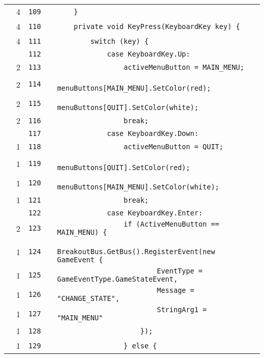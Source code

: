 \documentclass[a4paper,landscape,10pt]{article}
\begin{document}
\begin{longtable}[l]{lrrll}
\cellcolor{green} & 4 & \verb~109~ & & \verb~    }~\\
\cellcolor{green} & 4 & \verb~110~ & & \verb~    private void KeyPress(KeyboardKey key) {~\\
\cellcolor{green} & 4 & \verb~111~ & & \verb~        switch (key) {~\\
\cellcolor{gray} &  & \verb~112~ & & \verb~            case KeyboardKey.Up:~\\
\cellcolor{green} & 2 & \verb~113~ & & \verb~                activeMenuButton = MAIN_MENU;~\\
\cellcolor{green} & 2 & \verb~114~ & & \verb~                menuButtons[MAIN_MENU].SetColor(red);~\\
\cellcolor{green} & 2 & \verb~115~ & & \verb~                menuButtons[QUIT].SetColor(white);~\\
\cellcolor{green} & 2 & \verb~116~ & & \verb~                break;~\\
\cellcolor{gray} &  & \verb~117~ & & \verb~            case KeyboardKey.Down:~\\
\cellcolor{green} & 1 & \verb~118~ & & \verb~                activeMenuButton = QUIT;~\\
\cellcolor{green} & 1 & \verb~119~ & & \verb~                menuButtons[QUIT].SetColor(red);~\\
\cellcolor{green} & 1 & \verb~120~ & & \verb~                menuButtons[MAIN_MENU].SetColor(white);~\\
\cellcolor{green} & 1 & \verb~121~ & & \verb~                break;~\\
\cellcolor{gray} &  & \verb~122~ & & \verb~            case KeyboardKey.Enter:~\\
\cellcolor{orange} & 2 & \verb~123~ & & \verb~                if (ActiveMenuButton == MAIN_MENU) {~\\
\cellcolor{green} & 1 & \verb~124~ & & \verb~                    BreakoutBus.GetBus().RegisterEvent(new GameEvent {~\\
\cellcolor{green} & 1 & \verb~125~ & & \verb~                        EventType = GameEventType.GameStateEvent,~\\
\cellcolor{green} & 1 & \verb~126~ & & \verb~                        Message = "CHANGE_STATE",~\\
\cellcolor{green} & 1 & \verb~127~ & & \verb~                        StringArg1 = "MAIN_MENU"~\\
\cellcolor{green} & 1 & \verb~128~ & & \verb~                    });~\\
\cellcolor{green} & 1 & \verb~129~ & & \verb~                } else {~\\

\end{longtable}
\end{document}
